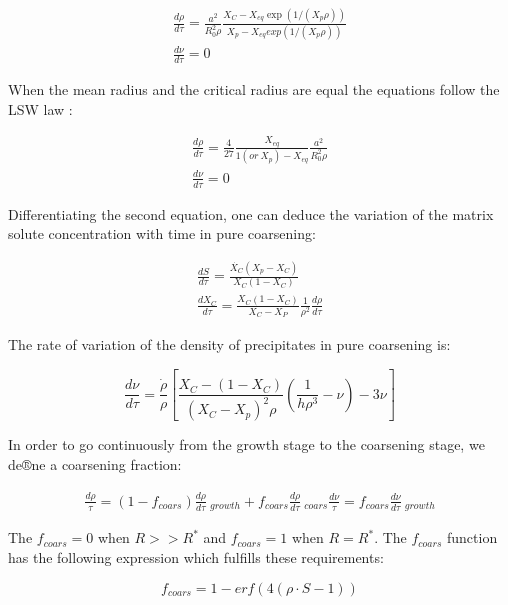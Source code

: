 \documentclass[12pt,a4paper]{article}
\begin{document}
\begin{subequations}
		\begin{align}
 \frac{d\rho}{d\tau} = \frac{a^2}{R_0^2 \rho}\frac{X_C -X_{eq}\exp(1/(X_p\rho))}{X_p - X_{eq}exp(1/(X_p\rho))}  \\
 \frac{d\nu}{d\tau} = 0 
 	\end{align} 
\end{subequations}

When the mean radius and the critical radius are equal the equations follow the LSW law :

\begin{subequations}
	\begin{align}
	\frac{d\rho}{d\tau} = \frac{4}{27}\frac{X_{eq}}{1 (or~X_p) - X_{eq}} \frac{a^2}{R_0^2 \rho} \\
	\frac{d\nu}{d\tau} = 0 
	\end{align} 
\end{subequations}

Differentiating the second equation, one can deduce the variation of the matrix solute concentration with time in pure coarsening:

\begin{subequations}
	\begin{align}
	\frac{dS}{d\tau} = \frac{\dot{X_C}(X_p - X_C)}{X_C(1-X_C)} \\
	\frac{dX_C}{d\tau} = \frac{X_C(1-X_C)}{X_C-X_P} \frac{1}{\rho^2} \frac{d\rho}{d\tau}
	\end{align} 
\end{subequations}

The rate of variation of the density of precipitates in pure coarsening is:

\begin{equation}
\frac{d\nu}{d\tau} = \frac{\dot{\rho}}{\rho} \left[  \frac{X_C-(1-X_C)}{(X_C - X_p)^2 \rho} \left( \frac{1}{h\rho^3} - \nu\right)  - 3\nu \right] 
\end{equation}

In order to go continuously from the growth stage to the coarsening stage, we de®ne a coarsening fraction:

\begin{subequations}
	\begin{align}
	\frac{d\rho}{\tau} = (1-f_{coars}) \frac{d\rho}{d\tau}~ _{growth}  + f_{coars} \frac{d\rho}{d\tau}~ _{coars}
	\frac{d\nu}{\tau} = f_{coars} \frac{d\nu}{d\tau}~ _{growth}
	\end{align} 
\end{subequations}

The $f_{coars} = 0$ when $R >> R^*$ and $f_{coars} = 1$ when $R = R^*$. The $f_{coars}$ function has the following expression which fulfills these
requirements:

\begin{equation}
f_{coars} = 1 - erf \left(4(\rho \cdot S - 1) \right)
\end{equation}
%
%
\end{document}
